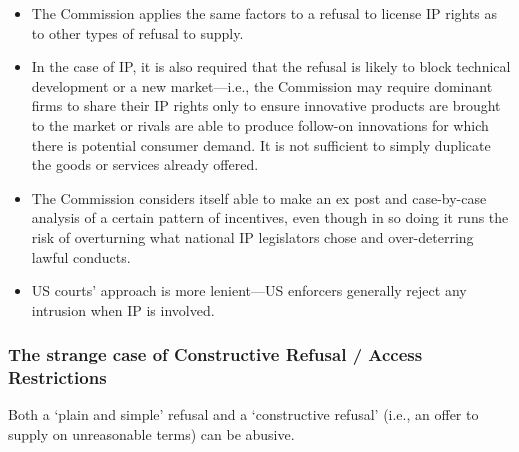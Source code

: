         \begin{itemize}
            \item The Commission applies the same factors to a refusal to license IP rights as to other types of refusal to supply.
            \item In the case of IP, it is also required that the refusal is likely to block technical development or a new market—i.e., the Commission may require dominant firms to share their IP rights only to ensure innovative products are brought to the market or rivals are able to produce follow-on innovations for which there is potential consumer demand. It is not sufficient to simply duplicate the goods or services already offered.
            \item The Commission considers itself able to make an ex post and case-by-case analysis of a certain pattern of incentives, even though in so doing it runs the risk of overturning what national IP legislators chose and over-deterring lawful conducts.
            \item US courts’ approach is more lenient—US enforcers generally reject any intrusion when IP is involved.
        \end{itemize}


\newpage
        \subsubsection{The strange case of Constructive Refusal / Access Restrictions}

        Both a ‘plain and simple’ refusal and a ‘constructive refusal’ (i.e., an offer to supply on unreasonable terms) can be abusive.

